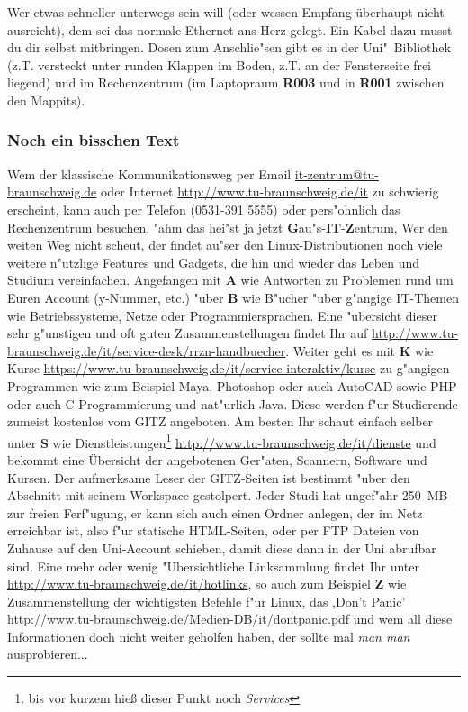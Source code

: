 Wer etwas schneller unterwegs sein will (oder wessen Empfang überhaupt 
nicht ausreicht), dem sei das normale Ethernet ans
Herz gelegt. Ein Kabel dazu musst du dir selbst mitbringen. Dosen zum
Anschlie"sen gibt es in der Uni"~Bibliothek (z.T. versteckt unter runden
Klappen im Boden, z.T. an der Fensterseite frei liegend) und im
Rechenzentrum (im Laptopraum \textbf{R003} und in \textbf{R001} zwischen den
Mappits).

\subsubsection{Noch ein bisschen Text}
Wem der klassische Kommunikationsweg per Email \url{it-zentrum@tu-braunschweig.de} oder Internet \mbox{\url{http://www.tu-braunschweig.de/it}} zu schwierig erscheint, kann auch per Telefon (0531-391 5555) oder pers"ohnlich das Rechenzentrum besuchen, "ahm das hei"st ja jetzt \textbf{G}au"s-\textbf{IT}-\textbf{Z}entrum, Wer den weiten Weg nicht scheut, der findet au"ser den Linux-Distributionen noch viele weitere n"utzlige Features und Gadgets, die hin und wieder das Leben und Studium vereinfachen. Angefangen mit \textbf{A} wie Antworten zu Problemen rund um Euren Account (y-Nummer, etc.)
"uber \textbf{B} wie B"ucher "uber g"angige IT-Themen wie Betriebssysteme, Netze oder Programmiersprachen. Eine "ubersicht dieser sehr g"unstigen und oft guten Zusammenstellungen findet Ihr auf \url{http://www.tu-braunschweig.de/it/service-desk/rrzn-handbuecher}. Weiter geht es mit \textbf{K} wie Kurse \url{https://www.tu-braunschweig.de/it/service-interaktiv/kurse} zu g"angigen Programmen wie zum Beispiel Maya, Photoshop oder auch AutoCAD sowie PHP oder auch C-Programmierung und nat"urlich Java. Diese werden f"ur Studierende zumeist kostenlos vom GITZ angeboten. Am besten Ihr schaut einfach selber unter \textbf{S} wie Dienstleistungen\footnote{bis vor kurzem hieß dieser Punkt noch \textit{Services}} \url{http://www.tu-braunschweig.de/it/dienste} und bekommt eine Übersicht der angebotenen Ger"aten, Scannern, Software und Kursen.\newline
Der aufmerksame Leser der GITZ-Seiten ist bestimmt "uber den Abschnitt mit seinem Workspace gestolpert. Jeder Studi hat ungef"ahr 250~MB zur freien Ferf"ugung, er kann sich auch einen Ordner anlegen, der im Netz erreichbar ist, also f"ur statische HTML-Seiten, oder per FTP Dateien von Zuhause auf den Uni-Account schieben, damit diese dann in der Uni abrufbar sind.\newline
Eine mehr oder wenig "Ubersichtliche Linksammlung findet Ihr unter \url{http://www.tu-braunschweig.de/it/hotlinks}, so auch zum Beispiel \textbf{Z} wie Zusammenstellung der wichtigsten Befehle f"ur Linux, das ,Don't Panic' \url{http://www.tu-braunschweig.de/Medien-DB/it/dontpanic.pdf}
und wem all diese Informationen doch nicht weiter geholfen haben, der sollte mal \textit{man man} ausprobieren...
